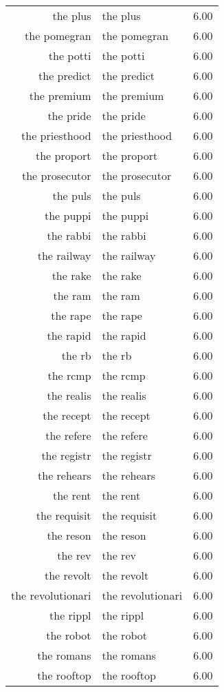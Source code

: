 \begin{table}[ht]
\begin{tabular}{rlr}
  the plus & the plus & 6.00 \\ 
  the pomegran & the pomegran & 6.00 \\ 
  the potti & the potti & 6.00 \\ 
  the predict & the predict & 6.00 \\ 
  the premium & the premium & 6.00 \\ 
  the pride & the pride & 6.00 \\ 
  the priesthood & the priesthood & 6.00 \\ 
  the proport & the proport & 6.00 \\ 
  the prosecutor & the prosecutor & 6.00 \\ 
  the puls & the puls & 6.00 \\ 
  the puppi & the puppi & 6.00 \\ 
  the rabbi & the rabbi & 6.00 \\ 
  the railway & the railway & 6.00 \\ 
  the rake & the rake & 6.00 \\ 
  the ram & the ram & 6.00 \\ 
  the rape & the rape & 6.00 \\ 
  the rapid & the rapid & 6.00 \\ 
  the rb & the rb & 6.00 \\ 
  the rcmp & the rcmp & 6.00 \\ 
  the realis & the realis & 6.00 \\ 
  the recept & the recept & 6.00 \\ 
  the refere & the refere & 6.00 \\ 
  the registr & the registr & 6.00 \\ 
  the rehears & the rehears & 6.00 \\ 
  the rent & the rent & 6.00 \\ 
  the requisit & the requisit & 6.00 \\ 
  the reson & the reson & 6.00 \\ 
  the rev & the rev & 6.00 \\ 
  the revolt & the revolt & 6.00 \\ 
  the revolutionari & the revolutionari & 6.00 \\ 
  the rippl & the rippl & 6.00 \\ 
  the robot & the robot & 6.00 \\ 
  the romans & the romans & 6.00 \\ 
  the rooftop & the rooftop & 6.00 \\ 

\end{tabular}
\end{table}
